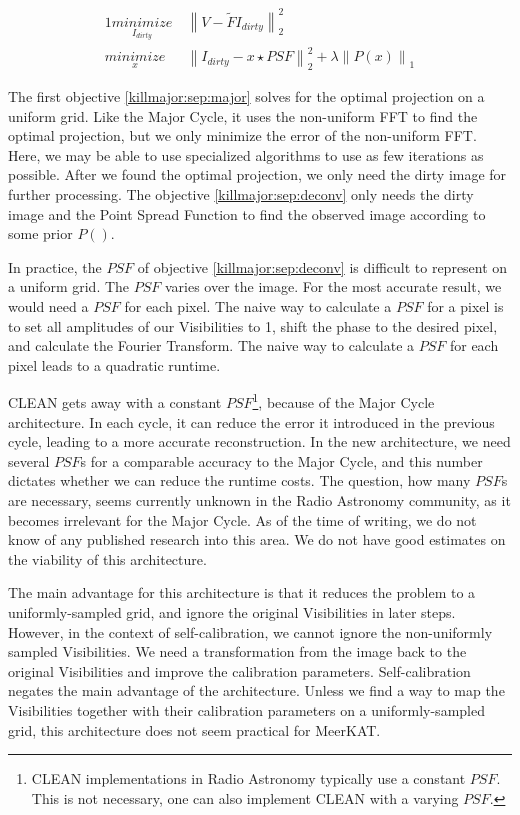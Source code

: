 \begin{alignat}{1}
\underset{I_{dirty}}{minimize} \:& \left \|  V - \tilde{F}I_{dirty} \right \|_2^2\label{killmajor:sep:major}\\
\underset{x}{minimize} \:& \left \| I_{dirty} - x \star PSF \right \|_2^2 + \lambda \left \| P(x) \right \|_1 \label{killmajor:sep:deconv}
\end{alignat}


The first objective \eqref{killmajor:sep:major} solves for the optimal projection on a uniform grid. Like the Major Cycle, it uses the non-uniform FFT to find the optimal projection, but we only minimize the error of the non-uniform FFT. Here, we may be able to use specialized algorithms to use as few iterations as possible. After we found the optimal projection, we only need the dirty image for further processing. The objective \eqref{killmajor:sep:deconv} only needs the dirty image and the Point Spread Function to find the observed image according to some prior $P()$.

In practice, the $PSF$ of objective \eqref{killmajor:sep:deconv} is difficult to represent on a uniform grid. The $PSF$ varies over the image. For the most accurate result, we would need a $PSF$ for each pixel. The naive way to calculate a $PSF$ for a pixel is to set all amplitudes of our Visibilities to 1, shift the phase to the desired pixel, and calculate the Fourier Transform. The naive way to calculate a $PSF$ for each pixel leads to a quadratic runtime.

CLEAN gets away with a constant $PSF$\footnote{CLEAN implementations in Radio Astronomy typically use a constant $PSF$. This is not necessary, one can also implement CLEAN with a varying $PSF$.}, because of the Major Cycle architecture. In each cycle, it can reduce the error it introduced in the previous cycle, leading to a more accurate reconstruction. In the new architecture, we need several $PSF$s for a comparable accuracy to the Major Cycle, and this number dictates whether we can reduce the runtime costs. The question, how many $PSF$s are necessary, seems currently unknown in the Radio Astronomy community, as it becomes irrelevant for the Major Cycle. As of the time of writing, we do not know of any published research into this area. We do not have good estimates on the viability of this architecture.

The main advantage for this architecture is that it reduces the problem to a uniformly-sampled grid, and ignore the original Visibilities in later steps. However, in the context of self-calibration, we cannot ignore the non-uniformly sampled Visibilities. We need a transformation from the image back to the original Visibilities and improve the calibration parameters. Self-calibration negates the main advantage of the architecture. Unless we find a way to map the Visibilities together with their calibration parameters on a uniformly-sampled grid, this architecture does not seem practical for MeerKAT.



